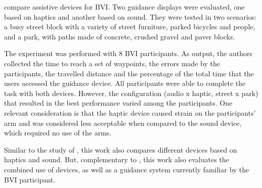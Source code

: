  compare assistive devices for BVI. Two guidance displays were evaluated, one based on haptics and another based on sound. They were tested in two scenarios: a busy street block with a variety of street furniture, parked bicycles and people, and a park, with paths made of concrete, crushed gravel and paver blocks. 

The experiment was performed with 8 BVI participants. As output, the authors collected the time to reach a set of waypoints, the errors made by the participants, the travelled distance and the percentage of the total time that the users accessed the guidance device. All participants were able to complete the task with both devices. However, the configuration (audio x haptic, street x park) that resulted in the best performance varied among the participants. One relevant consideration is that the haptic device caused strain on the participants' arm and was considered less acceptable when compared to the sound device, which required no use of the arms.

Similar to the study of , this work also compares different devices based on haptics and sound. But, complementary to , this work also evaluates the combined use of devices, as well as a guidance system currently familiar by the BVI participant.